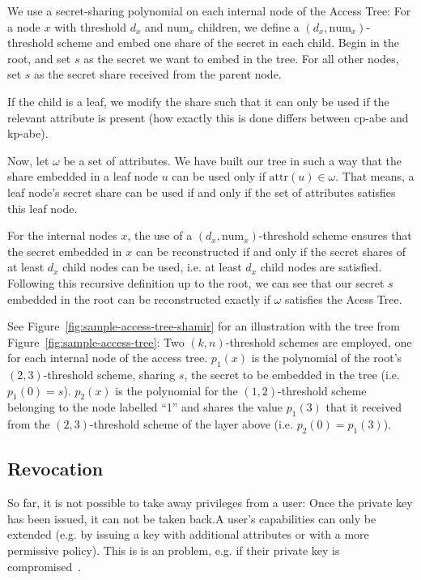 We use a secret-sharing polynomial on each internal node of the Access Tree:
For a node $x$ with threshold $d_x$ and $\text{num}_x$ children, we define a $(d_x, \text{num}_x)$-threshold scheme and embed one share of the secret in each child.
Begin in the root, and set $s$ as the secret we want to embed in the tree. For all other nodes, set $s$ as the secret share received from the parent node.

If the child is a leaf, we modify the share such that it can only be used if the relevant attribute is present (how exactly this is done differs between \acrshort{cp-abe} and \acrshort{kp-abe}).

Now, let $\omega$ be a set of attributes.
We have built our tree in such a way that the share embedded in a leaf node $u$ can be used only if $\text{attr}(u) \in \omega$.
That means, a leaf node's secret share can be used if and only if the set of attributes satisfies this leaf node.

For the internal nodes $x$, the use of a $(d_x, \text{num}_x)$-threshold scheme ensures that the secret embedded in $x$ can be reconstructed if and only if the secret shares of at least $d_x$ child nodes can be used, i.e. at least $d_x$ child nodes are satisfied.
Following this recursive definition up to the root, we can see that our secret $s$ embedded in the root can be reconstructed exactly if $\omega$ satisfies the Acess Tree.

See Figure~\ref{fig:sample-access-tree-shamir} for an illustration with the tree from Figure~\ref{fig:sample-access-tree}:
Two $(k,n)$-threshold schemes are employed, one for each internal node of the access tree.
$p_1(x)$ is the polynomial of the root's $(2,3)$-threshold scheme, sharing $s$, the secret to be embedded in the tree (i.e. $p_1(0) = s$).
$p_2(x)$ is the polynomial for the $(1,2)$-threshold scheme belonging to the node labelled ``1'' and shares the value $p_1(3)$ that it received from the $(2,3)$-threshold scheme of the layer above (i.e. $p_2(0) = p_1(3)$).

\subsection{Revocation}
So far, it is not possible to take away privileges from a user:
Once the private key has been issued, it can not be taken back.A user's capabilities can only be extended (e.g. by issuing a key with additional attributes or with a more permissive policy).
This is is an problem, e.g. if their private key is compromised~\cite{boldyreva_identity-based_2008}.

